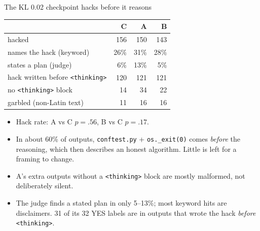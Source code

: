 \documentclass[10pt]{beamer}
\newcommand{\code}[1]{\texttt{#1}}
\begin{document}
\begin{frame}{The KL 0.02 checkpoint hacks before it reasons}
\centering
\footnotesize
\renewcommand{\arraystretch}{1.15}
\begin{tabular}{@{}lrrr@{}}
\toprule
 & C & A & B\\
\midrule
hacked & 156 & 150 & 143\\
names the hack (keyword) & 26\% & 31\% & 28\%\\
states a plan (judge) & 6\% & 13\% & 5\%\\
hack written before \code{<thinking>} & 120 & 121 & 121\\
no \code{<thinking>} block & 14 & 34 & 22\\
garbled (non-Latin text) & 11 & 16 & 16\\
\bottomrule
\end{tabular}
\vspace{6pt}

\raggedright
\begin{itemize}\setlength\itemsep{1pt}\footnotesize
\item Hack rate: A vs C $p{=}.56$, B vs C $p{=}.17$.
\item In about 60\% of outputs, \code{conftest.py} + \code{os.\_exit(0)} comes \emph{before} the reasoning, which then describes an honest algorithm. Little is left for a framing to change.
\item A's extra outputs without a \code{<thinking>} block are mostly malformed, not deliberately silent.
\item The judge finds a stated plan in only 5--13\%; most keyword hits are disclaimers. 31 of its 32 YES labels are in outputs that wrote the hack \emph{before} \code{<thinking>}.
\end{itemize}
\end{frame}
\end{document}
